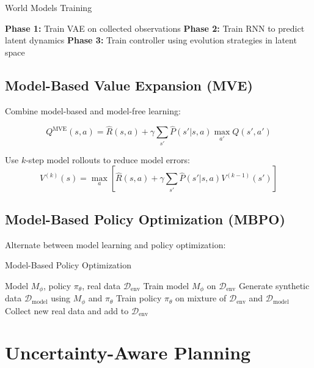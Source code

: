 \begin{algorithm}
\caption{World Models Training}
\begin{algorithmic}
\STATE \textbf{Phase 1:} Train VAE on collected observations
\STATE \textbf{Phase 2:} Train RNN to predict latent dynamics
\STATE \textbf{Phase 3:} Train controller using evolution strategies in latent space
\end{algorithmic}
\end{algorithm}

\subsection{Model-Based Value Expansion (MVE)}

Combine model-based and model-free learning:

\begin{equation}
Q^{\text{MVE}}(s,a) = \hat{R}(s,a) + \gamma \sum_{s'} \hat{P}(s'|s,a) \max_{a'} Q(s',a')
\end{equation}

Use $k$-step model rollouts to reduce model errors:
\begin{equation}
V^{(k)}(s) = \max_a \left[ \hat{R}(s,a) + \gamma \sum_{s'} \hat{P}(s'|s,a) V^{(k-1)}(s') \right]
\end{equation}

\subsection{Model-Based Policy Optimization (MBPO)}

Alternate between model learning and policy optimization:

\begin{algorithm}
\caption{Model-Based Policy Optimization}
\begin{algorithmic}
\REQUIRE Model $M_\phi$, policy $\pi_\theta$, real data $\mathcal{D}_{\text{env}}$
    \STATE Train model $M_\phi$ on $\mathcal{D}_{\text{env}}$
    \STATE Generate synthetic data $\mathcal{D}_{\text{model}}$ using $M_\phi$ and $\pi_\theta$
    \STATE Train policy $\pi_\theta$ on mixture of $\mathcal{D}_{\text{env}}$ and $\mathcal{D}_{\text{model}}$
    \STATE Collect new real data and add to $\mathcal{D}_{\text{env}}$
\ENDFOR
\end{algorithmic}
\end{algorithm}

\section{Uncertainty-Aware Planning}

